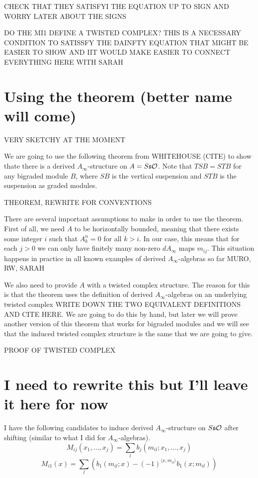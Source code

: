 \documentclass[twoside]{article}
\begin{document}
CHECK THAT THEY SATISFYI THE EQUATION UP TO SIGN AND WORRY LATER ABOUT THE SIGNS

DO THE MI1 DEFINE A TWISTED COMPLEX? THIS IS A NECESSARY CONDITION TO SATISSFY THE DAINFTY EQUATION THAT MIGHT BE EASIER TO SHOW AND IIT WOULD MAKE EASIER TO CONNECT EVERYTHING HERE WITH SARAH


\section{Using the theorem (better name will come)}

VERY SKETCHY AT THE MOMENT

We are going to use the following theorem from WHITEHOUSE (CITE) to show thate there is a derived $A_\infty$-structure on $A=S\mathfrak{s}{\mathcal O}$. Note that $TSB=STB$ for any bigraded module $B$, where $SB$ is the vertical suspension and $STB$ is the suspension as graded modules.

THEOREM, REWRITE FOR CONVENTIONS

There are several important assumptions to make in order to use the theorem. First of all, we need $A$ to be horizontally bounded, meaning that there exists some integer $i$ such that $A_k^n=0$ for all $k>i$. In our case, this means that for each $j>0$ we can only have finitely many non-zero $dA_\infty$ maps $m_{ij}$. This situation happens in practice in all known examples of derived $A_\infty$-algebras so far MURO, RW, SARAH

We also need to provide $A$ with a twisted complex structure. The reason for this is that the theorem uses the definition of derived $A_\infty$-algebras on an underlying twisted complex WRITE DOWN THE TWO EQUIVALENT DEFINITIONS AND CITE HERE. We are going to do this by hand, but later we will prove another version of this theorem that works for bigraded modules and we will see that the induced twisted complex structure is the same that we are going to give. 


PROOF OF TWISTED COMPLEX
\section{I need to rewrite this but I'll leave it  here for now}
I have the following candidates to induce derived $A_\infty$-structure on $S\mathfrak{s}{\mathcal O}$ after shifting (similar to what I did for $A_\infty$-algebras). 
\[M_{ij}(x_1,\dots, x_j)=\sum_l b_j(m_{il};x_1,\dots, x_j)\]
\[M_{i1}(x)= \sum_l (b_1(m_{il};x)-(-1)^{\langle x,m_{il}\rangle}b_1(x;m_{il}))\]
\end{document}
